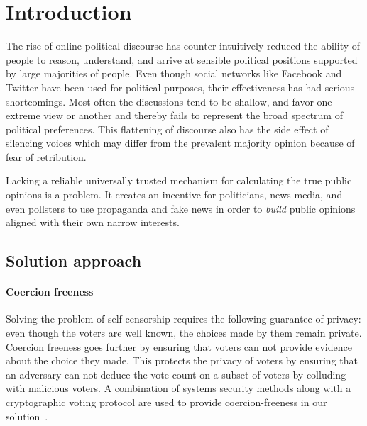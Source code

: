 
\section{Introduction} \label{section:Introduction}

The rise of online political discourse has counter-intuitively
reduced the ability of people to reason, understand, and arrive at
sensible political positions supported by large majorities of people.
Even though social networks like Facebook and Twitter have been used for political purposes, their effectiveness has had serious shortcomings. Most often the discussions tend to be shallow, and favor one extreme view or another and thereby fails to represent the broad spectrum of political preferences. This flattening of discourse also has the side effect of silencing voices which may differ from the prevalent majority opinion because of fear of retribution.

Lacking a reliable universally trusted mechanism
for calculating the true public opinions 
is a problem.
It creates an incentive for 
politicians, news media,  and even pollsters to use
propaganda and fake news in order to \emph{build} public opinions
aligned with their own narrow interests.

\subsection{Solution approach}
\paragraph{Coercion freeness}
Solving the problem of self-censorship requires
the following guarantee of privacy:
even though the voters are well known, the choices made by them
remain private.
Coercion freeness goes further by ensuring that 
voters can not provide evidence about the choice they made.
This protects the privacy of voters by ensuring that an adversary can
not deduce the vote count on a subset of voters by
colluding with malicious voters.
A combination of systems security
methods along with a cryptographic voting protocol
are used to provide coercion-freeness in our
solution~\cite{Cramer:1997:SOE:1754542.1754554,Karlof:2005:CVP:1251398.1251401}.

